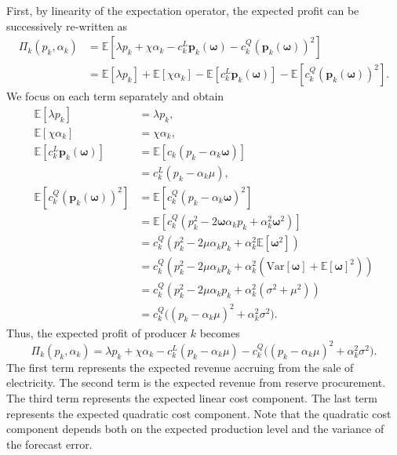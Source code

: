 \documentclass{article}
\begin{document}
First, by linearity of the expectation operator, the expected profit can be successively re-written as
\begin{align*}
\Pi_k(p_k, \alpha_k) &= \mathbb{E}[\lambda p_k + \chi \alpha_k - c_k^L \mathbf{p}_k(\boldsymbol{\omega}) - c_k^Q (\mathbf{p}_k(\boldsymbol{\omega}))^2]\\
&= \mathbb{E}[\lambda p_k] + \mathbb{E}[\chi \alpha_k] - \mathbb{E}[c_k^L \mathbf{p}_k(\boldsymbol{\omega})] - \mathbb{E}[c_k^Q (\mathbf{p}_k(\boldsymbol{\omega}))^2].
\end{align*}
We focus on each term separately and obtain
\begin{align*}
\mathbb{E}[\lambda p_k] &= \lambda p_k,\\
\mathbb{E}[\chi \alpha_k] &= \chi \alpha_k,\\
\mathbb{E}[c_k^L \mathbf{p}_k(\boldsymbol{\omega})] &= \mathbb{E}[c_k (p_k - \alpha_k \boldsymbol{\omega})]\\
&= c_k^L(p_k - \alpha_k \mu),\\
\mathbb{E}[c_k^Q (\mathbf{p}_k(\boldsymbol{\omega}))^2] &= \mathbb{E}[c_k^Q (p_k - \alpha_k \boldsymbol{\omega})^2]\\
&= \mathbb{E}[c_k^Q (p_k^2 - 2 \boldsymbol{\omega} \alpha_k p_k + \alpha_k^2 \boldsymbol{\omega}^2)]\\
&= c_k^Q (p_k^2 - 2\mu \alpha_k p_k + \alpha_k^2 \mathbb{E}[\boldsymbol{\omega}^2])\\
&= c_k^Q (p_k^2 - 2\mu \alpha_k p_k + \alpha_k^2 (\mbox{Var}[\boldsymbol{\omega}] + \mathbb{E}[\boldsymbol{\omega}]^2))\\
&= c_k^Q (p_k^2 - 2\mu \alpha_k p_k + \alpha_k^2 (\sigma^2 + \mu^2))\\
&= c_k^Q \big((p_k - \alpha_k \mu)^2 + \alpha_k^2 \sigma^2\big).
\end{align*}
Thus, the expected profit of producer $k$ becomes
\begin{equation*}
\Pi_k(p_k, \alpha_k) = \lambda p_k + \chi \alpha_k - c_k^L(p_k - \alpha_k \mu) - c_k^Q \big((p_k - \alpha_k \mu)^2 + \alpha_k^2 \sigma^2\big).
\end{equation*}
The first term represents the expected revenue accruing from the sale of electricity. The second term is the expected revenue from reserve procurement. The third term represents the expected linear cost component. The last term represents the expected quadratic cost component. Note that the quadratic cost component depends both on the expected production level and the variance of the forecast error.
\end{document}
